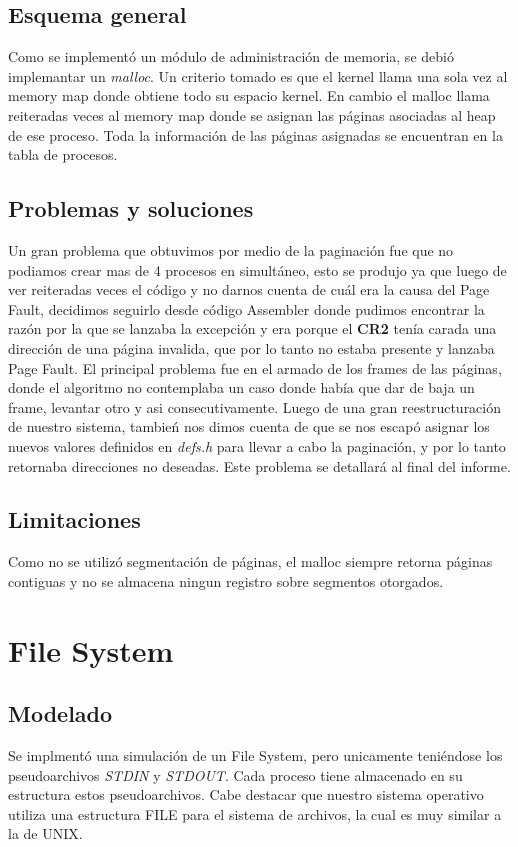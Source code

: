\documentclass[10pt,a4paper]{article}
\begin{document}
	\subsection{Esquema general}
		Como se implement\'o un m\'odulo de administraci\'on de memoria, se debi\'o implemantar un \textit{malloc}. Un criterio tomado es que el kernel llama una sola vez al memory map donde obtiene todo su espacio kernel. En cambio el malloc llama reiteradas veces al memory map donde se asignan las p\'aginas asociadas al heap de ese proceso. Toda la informaci\'on de las p\'aginas asignadas se encuentran en la tabla de procesos.
	\subsection{Problemas y soluciones}
		Un gran problema que obtuvimos por medio de la paginaci\'on fue que no podiamos crear mas de 4 procesos en simult\'aneo, esto se produjo ya que luego de ver reiteradas veces el c\'odigo y no darnos cuenta de cu\'al era la causa del Page Fault, decidimos seguirlo desde c\'odigo Assembler donde pudimos encontrar la raz\'on por la que se lanzaba la excepci\'on y era porque el \textbf{CR2} ten\'ia carada una direcci\'on de una p\'agina invalida, que por lo tanto no estaba presente y lanzaba Page Fault. El principal problema fue en el armado de los frames de las p\'aginas, donde el algoritmo no contemplaba un caso donde hab\'ia que dar de baja un frame, levantar otro y asi consecutivamente. Luego de una gran reestructuraci\'on de nuestro sistema, tambie\'n nos dimos cuenta de que se nos escap\'o asignar los nuevos valores definidos en \textit{defs.h} para llevar a cabo la paginaci\'on, y por lo tanto retornaba direcciones no deseadas. Este problema se detallar\'a al final del informe.
	\subsection{Limitaciones}
		Como no se utiliz\'o segmentaci\'on de p\'aginas, el malloc siempre retorna p\'aginas contiguas y no se almacena ningun registro sobre segmentos otorgados.

\section{File System} 
	\subsection{Modelado}
		Se implment\'o una simulaci\'on de un File System, pero unicamente teni\'endose los pseudoarchivos \textit{STDIN} y \textit{STDOUT}. Cada proceso tiene almacenado en su estructura estos pseudoarchivos. Cabe destacar que nuestro sistema operativo utiliza una estructura FILE para el sistema de archivos, la cual es muy similar a la de UNIX.
\end{document}
